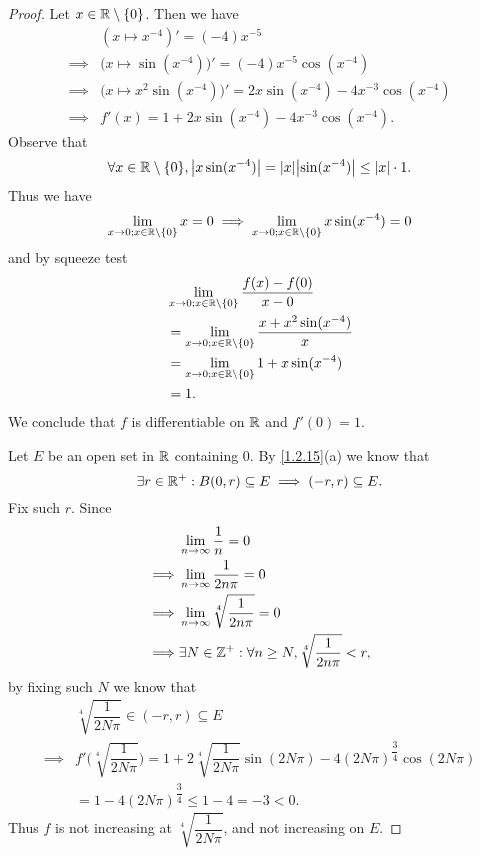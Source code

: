 \begin{proof}
  Let \(x \in \mathbb{R} \setminus \{0\}\).
  Then we have
  \begin{align*}
             & (x \mapsto x^{-4})' = (-4) x^{-5}                                               \\
    \implies & \big(x \mapsto \sin(x^{-4})\big)' = (-4) x^{-5} \cos(x^{-4})                    \\
    \implies & \big(x \mapsto x^2 \sin(x^{-4})\big)' = 2x \sin(x^{-4}) - 4 x^{-3} \cos(x^{-4}) \\
    \implies & f'(x) = 1 + 2 x \sin(x^{-4}) - 4 x^{-3} \cos(x^{-4}).
  \end{align*}
  Observe that
  \[
    \forall x \in \R \setminus \{0\}, \abs{x \sin(x^{-4})} = \abs{x} \abs{\sin(x^{-4})} \leq \abs{x} \cdot 1.
  \]
  Thus we have
  \[
    \lim_{x \to 0 ; x \in \mathbb{R} \setminus \{0\}} x = 0 \implies \lim_{x \to 0 ; x \in \mathbb{R} \setminus \{0\}} x \sin(x^{-4}) = 0
  \]
  and by squeeze test
  \begin{align*}
     & \lim_{x \to 0 ; x \in \mathbb{R} \setminus \{0\}} \dfrac{f(x) - f(0)}{x - 0}        \\
     & = \lim_{x \to 0 ; x \in \mathbb{R} \setminus \{0\}} \dfrac{x + x^2 \sin(x^{-4})}{x} \\
     & = \lim_{x \to 0 ; x \in \mathbb{R} \setminus \{0\}} 1 + x \sin(x^{-4})              \\
     & = 1.
  \end{align*}
  We conclude that \(f\) is differentiable on \(\mathbb{R}\) and \(f'(0) = 1\).

  Let \(E\) be an open set in \(\mathbb{R}\) containing \(0\).
  By \cref{1.2.15}(a) we know that
  \[
    \exists r \in \mathbb{R}^+ : B(0, r) \subseteq E \implies (-r, r) \subseteq E.
  \]
  Fix such \(r\).
  Since
  \begin{align*}
             & \lim_{n \to \infty} \dfrac{1}{n} = 0                                     \\
    \implies & \lim_{n \to \infty} \dfrac{1}{2 n \pi} = 0                               \\
    \implies & \lim_{n \to \infty} \sqrt[4]{\dfrac{1}{2 n \pi}} = 0                     \\
    \implies & \exists N \in \mathbb{Z}^+ : \forall n \geq N, \sqrt[4]{\dfrac{1}{2 n \pi}} < r,
  \end{align*}
  by fixing such \(N\) we know that
  \begin{align*}
             & \sqrt[4]{\dfrac{1}{2 N \pi}} \in (-r, r) \subseteq E                                                                                     \\
    \implies & f'\bigg(\sqrt[4]{\dfrac{1}{2 N \pi}}\bigg) = 1 + 2 \sqrt[4]{\dfrac{1}{2 N \pi}} \sin(2 N \pi) - 4 (2 N \pi)^{\dfrac{3}{4}} \cos(2 N \pi) \\
             & = 1 - 4 (2 N \pi)^{\dfrac{3}{4}} \leq 1 - 4 = -3 < 0.
  \end{align*}
  Thus \(f\) is not increasing at \(\sqrt[4]{\dfrac{1}{2 N \pi}}\), and not increasing on \(E\).
\end{proof}

